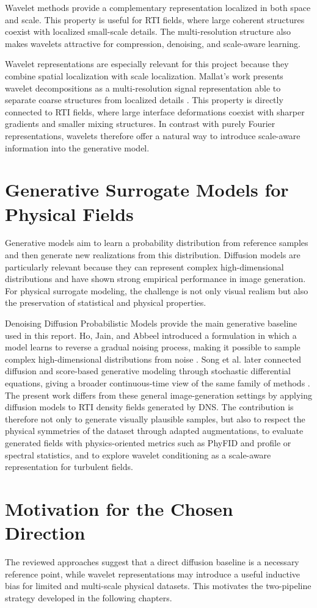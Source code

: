 Wavelet methods provide a complementary representation localized in both space and scale. This property is useful for RTI fields, where large coherent structures coexist with localized small-scale details. The multi-resolution structure also makes wavelets attractive for compression, denoising, and scale-aware learning.

Wavelet representations are especially relevant for this project because they
combine spatial localization with scale localization. Mallat's work presents
wavelet decompositions as a multi-resolution signal representation able to
separate coarse structures from localized details \citep{Mallat2009}. This
property is directly connected to RTI fields, where large interface
deformations coexist with sharper gradients and smaller mixing structures. In
contrast with purely Fourier representations, wavelets therefore offer a
natural way to introduce scale-aware information into the generative model.

\section{Generative Surrogate Models for Physical Fields}

Generative models aim to learn a probability distribution from reference samples and then generate new realizations from this distribution. Diffusion models are particularly relevant because they can represent complex high-dimensional distributions and have shown strong empirical performance in image generation. For physical surrogate modeling, the challenge is not only visual realism but also the preservation of statistical and physical properties.

Denoising Diffusion Probabilistic Models provide the main generative baseline
used in this report. Ho, Jain, and Abbeel introduced a formulation in which a
model learns to reverse a gradual noising process, making it possible to sample
complex high-dimensional distributions from noise \citep{Ho2020DDPM}. Song et
al. later connected diffusion and score-based generative modeling through
stochastic differential equations, giving a broader continuous-time view of the
same family of methods \citep{Song2021SDE}. The present work differs from these
general image-generation settings by applying diffusion models to RTI density
fields generated by DNS. The contribution is therefore not only to generate
visually plausible samples, but also to respect the physical symmetries of the
dataset through adapted augmentations, to evaluate generated fields with
physics-oriented metrics such as PhyFID and profile or spectral statistics, and
to explore wavelet conditioning as a scale-aware representation for turbulent
fields.

\section{Motivation for the Chosen Direction}

The reviewed approaches suggest that a direct diffusion baseline is a necessary reference point, while wavelet representations may introduce a useful inductive bias for limited and multi-scale physical datasets. This motivates the two-pipeline strategy developed in the following chapters.
